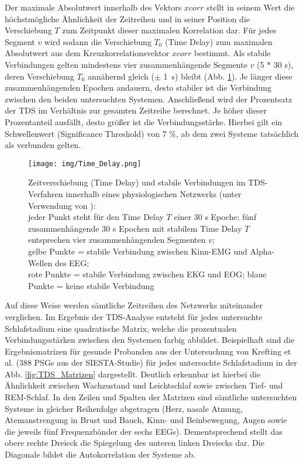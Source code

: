 Der maximale Absolutwert innerhalb des Vektors $xcorr$ stellt in seinem Wert die höchstmögliche Ähnlichkeit der Zeitreihen und in seiner Position die Verschiebung $T$ zum Zeitpunkt dieser maximalen Korrelation dar. Für jedes Segment $v$ wird sodann die Verschiebung $T_0$ (Time Delay) zum maximalen Absolutwert aus dem Kreuzkorrelationsvektor $xcorr$ bestimmt. Als stabile Verbindungen gelten mindestens vier zusammenhängende Segmente $v$ (5 $*$ 30 s), deren Verschiebung $T_0$ annähernd gleich ($\pm$ 1~s) bleibt (Abb. \ref{fig:TimeDelay}). Je länger diese zusammenhängenden Epochen andauern, desto stabiler ist die Verbindung zwischen den beiden untersuchten Systemen. Anschließend wird der Prozentsatz der TDS im Verhältnis zur gesamten Zeitreihe berechnet. Je höher dieser Prozentanteil ausfällt, desto größer ist die Verbindungsstärke. Hierbei gilt ein Schwellenwert (Significance Threshold) von 7 \%, ab dem zwei Systeme tatsächlich als verbunden gelten. \parencite{bashan_network_2012}

\begin{figure}[H]
	\centering
	\texttt{[image: img/Time\_Delay.png]}
	\caption[Zeitverschiebung (Time Delay) und stabile Verbindungen im \acs{TDS}-Verfahren]{Zeitverschiebung (Time Delay) und stabile Verbindungen im \acs{TDS}-Verfahren innerhalb eines physiologischen Netzwerks (unter Verwendung von \parencite{bashan_network_2012}):\\jeder Punkt steht für den Time Delay $T$ einer 30 s Epoche; fünf zusammenhängende 30 s Epochen mit stabilem Time Delay $T$ entsprechen vier zusammenhängenden Segmenten $v$;\\gelbe Punkte = stabile Verbindung zwischen Kinn-\acs{EMG} und Alpha-Wellen des \acs{EEG};\\rote Punkte = stabile Verbindung zwischen \acs{EKG} und \acs{EOG}; blaue Punkte = keine stabile Verbindung}
	\label{fig:TimeDelay}
\end{figure}

Auf diese Weise werden sämtliche Zeitreihen des Netzwerks miteinander verglichen. Im Ergebnis der \acs{TDS}-Analyse entsteht für jedes untersuchte Schlafstadium eine quadratische Matrix, welche die prozentualen Verbindungsstärken zwischen den Systemen farbig abbildet. Beispielhaft sind die Ergebnismatrizen für gesunde Probanden aus der Untersuchung von Krefting et al. \parencite{krefting_altersabhangigkeit_2016} (388 \acs{PSG}s aus der SIESTA-Studie) für jedes untersuchte Schlafstadium in der Abb. \ref{fig:TDS_Matrizen} dargestellt. Deutlich erkennbar ist hierbei die Ähnlichkeit zwischen Wachzustand und Leichtschlaf sowie zwischen Tief- und \acs{REM}-Schlaf. In den Zeilen und Spalten der Matrizen sind sämtliche untersuchten Systeme in gleicher Reihenfolge abgetragen (Herz, nasale Atmung, Atemanstrengung in Brust und Bauch, Kinn- und Beinbewegung, Augen sowie die jeweils fünf Frequenzbänder der sechs \acs{EEG}s). Dementsprechend stellt das obere rechte Dreieck die Spiegelung des unteren linken Dreiecks dar. Die Diagonale bildet die Autokorrelation der Systeme ab.\\

